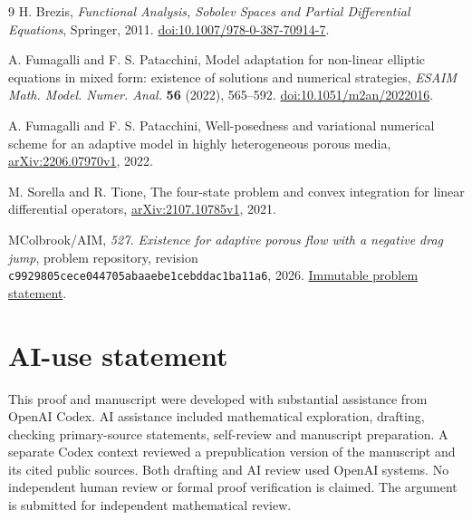 \documentclass[11pt]{article}
\theoremstyle{remark}
\begin{document}
\clearpage
\begin{thebibliography}{9}
H. Brezis, \emph{Functional Analysis, Sobolev Spaces and Partial Differential
Equations}, Springer, 2011.
\href{https://doi.org/10.1007/978-0-387-70914-7}{doi:10.1007/978-0-387-70914-7}.

A. Fumagalli and F. S. Patacchini,
Model adaptation for non-linear elliptic equations in mixed form:
existence of solutions and numerical strategies,
\emph{ESAIM Math. Model. Numer. Anal.} \textbf{56} (2022), 565--592.
\href{https://doi.org/10.1051/m2an/2022016}{doi:10.1051/m2an/2022016}.

A. Fumagalli and F. S. Patacchini,
Well-posedness and variational numerical scheme for an adaptive model in
highly heterogeneous porous media,
\href{https://arxiv.org/abs/2206.07970v1}{arXiv:2206.07970v1}, 2022.

M. Sorella and R. Tione,
The four-state problem and convex integration for linear differential operators,
\href{https://arxiv.org/abs/2107.10785v1}{arXiv:2107.10785v1}, 2021.

MColbrook/AIM, \emph{527. Existence for adaptive porous flow with a negative
drag jump}, problem repository, revision
\texttt{c9929805cece044705abaaebe1cebddac1ba11a6}, 2026.
\href{https://github.com/MColbrook/AIM/blob/c9929805cece044705abaaebe1cebddac1ba11a6/problems/527-negative-jump-adaptive-flow.md}{Immutable problem statement}.
\end{thebibliography}

\section*{AI-use statement}
This proof and manuscript were developed with substantial assistance from
OpenAI Codex. AI assistance included mathematical exploration, drafting,
checking primary-source statements, self-review and manuscript preparation.
A separate Codex context reviewed a prepublication version of the manuscript
and its cited public sources. Both drafting and AI review used OpenAI systems.
No independent human review or formal proof verification is claimed.
The argument is submitted for independent mathematical review.
\end{document}
